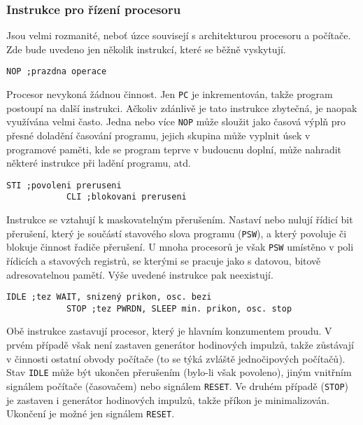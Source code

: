         \subsubsection{Instrukce pro řízení procesoru}\label{MIT:sssec_inst_cpu_cntrl} 
          Jsou velmi rozmanité, neboť úzce souvisejí s architekturou procesoru a počítače. Zde bude 
          uvedeno jen několik instrukcí, které se běžně vyskytují.          
          \begin{lstlisting}[style=luaMITASMStyle]
            NOP ;prazdna operace
          \end{lstlisting}
          Procesor nevykoná žádnou činnost. Jen \texttt{PC} je inkrementován, takže program 
          postoupí na další instrukci. Ačkoliv zdánlivě je tato instrukce zbytečná, je naopak 
          využívána velmi často. Jedna nebo více \texttt{NOP} může sloužit jako časová výplň pro 
          přesné doladění časování programu, jejich skupina může vyplnit úsek v programové paměti, 
          kde se program teprve v budoucnu doplní, může nahradit některé instrukce při ladění 
          programu, atd.          
          \begin{lstlisting}[style=luaMITASMStyle]
            STI ;povoleni preruseni
            CLI ;blokovani preruseni
          \end{lstlisting}
          Instrukce se vztahují k maskovatelným přerušením. Nastaví nebo nulují řídicí bit 
          přerušení, který je součástí stavového slova programu (\texttt{PSW}), a který povoluje či 
          blokuje činnost řadiče přerušení. U mnoha procesorů je však \texttt{PSW} umístěno v poli 
          řídicích a stavových registrů, se kterými se pracuje jako s datovou, bitově 
          adresovatelnou pamětí. Výše uvedené instrukce pak neexistují.          
          \begin{lstlisting}[style=luaMITASMStyle]
            IDLE ;tez WAIT, snizený prikon, osc. bezi
            STOP ;tez PWRDN, SLEEP min. prikon, osc. stop
          \end{lstlisting}
          Obě instrukce zastavují procesor, který je hlavním konzumentem proudu. V prvém případě 
          však není zastaven generátor hodinových impulzů, takže zůstávají v činnosti ostatní 
          obvody počítače (to se týká zvláště jednočipových počítačů). Stav \texttt{IDLE} může být 
          ukončen přerušením (bylo-li však povoleno), jiným vnitřním signálem počítače (časovačem) 
          nebo signálem \texttt{RESET}. Ve druhém případě (\texttt{STOP}) je zastaven i generátor 
          hodinových impulzů, takže příkon je minimalizován. Ukončení je možné jen signálem 
          \texttt{RESET}.
          
